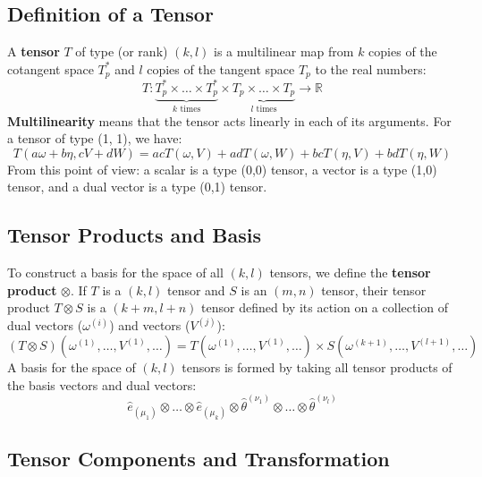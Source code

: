 \documentclass[11pt, a4paper]{report}
\begin{document}
\subsection*{Definition of a Tensor}

A \textbf{tensor} $T$ of type (or rank) $(k, l)$ is a multilinear map from $k$ copies of the cotangent space $T_p^*$ and $l$ copies of the tangent space $T_p$ to the real numbers:
\begin{equation}
    T: \underbrace{T_p^* \times \dots \times T_p^*}_{k \text{ times}} \times \underbrace{T_p \times \dots \times T_p}_{l \text{ times}} \to \mathbb{R}
\end{equation}
\textbf{Multilinearity} means that the tensor acts linearly in each of its arguments. For a tensor of type (1, 1), we have:
\begin{equation}
    T(a\omega + b\eta, cV + dW) = acT(\omega, V) + adT(\omega, W) + bcT(\eta, V) + bdT(\eta, W)
\end{equation}
From this point of view: a scalar is a type (0,0) tensor, a vector is a type (1,0) tensor, and a dual vector is a type (0,1) tensor.

\subsection*{Tensor Products and Basis}

To construct a basis for the space of all $(k,l)$ tensors, we define the \textbf{tensor product} $\otimes$. If $T$ is a $(k,l)$ tensor and $S$ is an $(m,n)$ tensor, their tensor product $T \otimes S$ is a $(k+m, l+n)$ tensor defined by its action on a collection of dual vectors ($\omega^{(i)}$) and vectors ($V^{(j)}$):
\begin{equation}
    (T \otimes S)(\omega^{(1)}, \dots, V^{(1)}, \dots) = T(\omega^{(1)}, \dots, V^{(1)}, \dots) \times S(\omega^{(k+1)}, \dots, V^{(l+1)}, \dots)
\end{equation}
A basis for the space of $(k,l)$ tensors is formed by taking all tensor products of the basis vectors and dual vectors:
\begin{equation}
    \hat{e}_{(\mu_1)} \otimes \dots \otimes \hat{e}_{(\mu_k)} \otimes \hat{\theta}^{(\nu_1)} \otimes \dots \otimes \hat{\theta}^{(\nu_l)}
\end{equation}

\subsection*{Tensor Components and Transformation}
\end{document}

